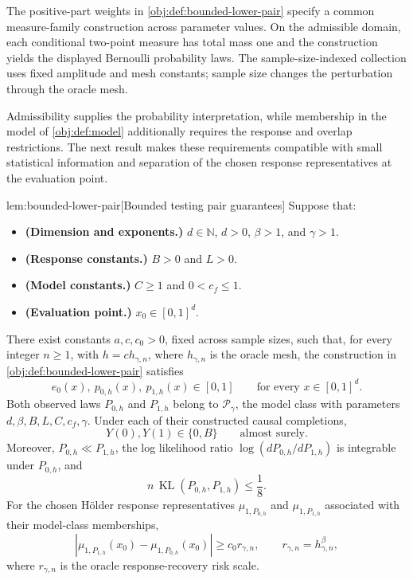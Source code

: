 \documentclass[11pt]{article}
\begin{document}
The positive-part weights in \cref{obj:def:bounded-lower-pair} specify a common measure-family construction across parameter values. On the admissible domain, each conditional two-point measure has total mass one and the construction yields the displayed Bernoulli probability laws. The sample-size-indexed collection  uses fixed amplitude and mesh constants; sample size changes the perturbation through the oracle mesh.

Admissibility supplies the probability interpretation, while membership in the model of \cref{obj:def:model} additionally requires the response and overlap restrictions. The next result makes these requirements compatible with small statistical information and separation of the chosen response representatives at the evaluation point.

\begin{lemmav}{lem:bounded-lower-pair}[Bounded testing pair guarantees]
Suppose that:
\begin{itemize}
\item \textbf{(Dimension and exponents.)} \(d\in\mathbb N\), \(d>0\), \(\beta>1\), and \(\gamma>1\).
\item \textbf{(Response constants.)} \(B>0\) and \(L>0\).
\item \textbf{(Model constants.)} \(C\ge1\) and \(0<c_f\le1\).
\item \textbf{(Evaluation point.)} \(x_0\in[0,1]^d\).
\end{itemize}
There exist constants \(a,c,c_0>0\), fixed across sample sizes, such that, for every integer \(n\ge1\), with \(h=ch_{\gamma,n}\), where \(h_{\gamma,n}\) is the oracle mesh, the construction in \cref{obj:def:bounded-lower-pair} satisfies
\[
e_0(x),\ p_{0,h}(x),\ p_{1,h}(x)\in[0,1]
\qquad\text{for every }x\in[0,1]^d.
\]
Both observed laws \(P_{0,h}\) and \(P_{1,h}\) belong to \(\mathcal P_\gamma\), the model class with parameters \(d,\beta,B,L,C,c_f,\gamma\). Under each of their constructed causal completions,
\[
Y(0),Y(1)\in\{0,B\}
\qquad\text{almost surely}.
\]
Moreover, \(P_{0,h}\ll P_{1,h}\), the log likelihood ratio
\(\log(dP_{0,h}/dP_{1,h})\) is integrable under \(P_{0,h}\), and
\[
n\,\operatorname{KL}(P_{0,h},P_{1,h})\le\frac18.
\]
For the chosen Hölder response representatives \(\mu_{1,P_{0,h}}\) and \(\mu_{1,P_{1,h}}\) associated with their model-class memberships,
\[
\left|\mu_{1,P_{1,h}}(x_0)-\mu_{1,P_{0,h}}(x_0)\right|
\ge c_0 r_{\gamma,n},
\qquad
r_{\gamma,n}=h_{\gamma,n}^{\beta},
\]
where \(r_{\gamma,n}\) is the oracle response-recovery risk scale.
\end{lemmav}
\end{document}
